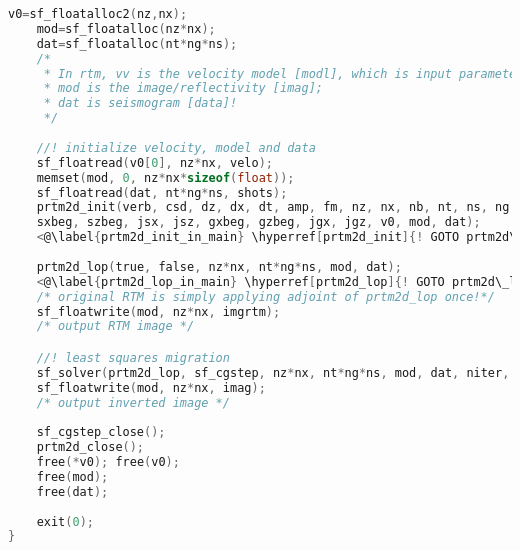\documentclass[a4paper,11pt]{article}
\theoremstyle{mytheor}
\begin{document}
\begin{lstlisting}[label={main},language=C,tabsize=4,caption=main()]
	v0=sf_floatalloc2(nz,nx);
	mod=sf_floatalloc(nz*nx);
	dat=sf_floatalloc(nt*ng*ns);
	/* 
	 * In rtm, vv is the velocity model [modl], which is input parameter; 
	 * mod is the image/reflectivity [imag]; 
	 * dat is seismogram [data]! 
	 */
	
	//! initialize velocity, model and data
	sf_floatread(v0[0], nz*nx, velo);
	memset(mod, 0, nz*nx*sizeof(float));
	sf_floatread(dat, nt*ng*ns, shots);
	prtm2d_init(verb, csd, dz, dx, dt, amp, fm, nz, nx, nb, nt, ns, ng, 
	sxbeg, szbeg, jsx, jsz, gxbeg, gzbeg, jgx, jgz, v0, mod, dat);
	<@\label{prtm2d_init_in_main} \hyperref[prtm2d_init]{! GOTO prtm2d\_init( )}@>
	
	prtm2d_lop(true, false, nz*nx, nt*ng*ns, mod, dat); 
	<@\label{prtm2d_lop_in_main} \hyperref[prtm2d_lop]{! GOTO prtm2d\_lop( )}@>
	/* original RTM is simply applying adjoint of prtm2d_lop once!*/
	sf_floatwrite(mod, nz*nx, imgrtm);
	/* output RTM image */

	//! least squares migration
	sf_solver(prtm2d_lop, sf_cgstep, nz*nx, nt*ng*ns, mod, dat, niter, "verb", verb, "end");
	sf_floatwrite(mod, nz*nx, imag);  
	/* output inverted image */
	
	sf_cgstep_close();
	prtm2d_close();
	free(*v0); free(v0);
	free(mod);
	free(dat); 
	
	exit(0);
}
\end{lstlisting}
\end{document}

